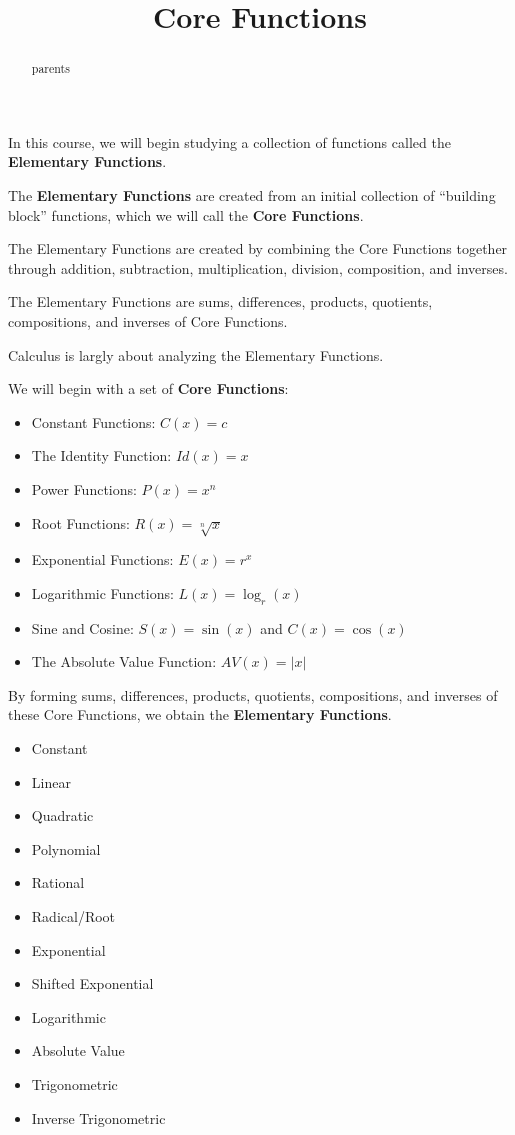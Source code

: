 \documentclass{ximera}
\title{Core Functions}
\begin{document}
\begin{abstract}
parents
\end{abstract}
\maketitle




In this course, we will begin studying a collection of functions called the \textbf{Elementary Functions}.

The \textbf{Elementary Functions} are created from an initial collection of ``building block'' functions, which we will call the \textbf{Core Functions}.

The Elementary Functions are created by combining the Core Functions together through addition, subtraction, multiplication, division, composition, and inverses.


The Elementary Functions are sums, differences, products, quotients, compositions, and inverses of Core Functions.

Calculus is largly about analyzing the Elementary Functions.






We will begin with a set of \textbf{Core Functions}:

\begin{itemize}
\item{Constant Functions: $C(x) = c$}
\item{The Identity Function: $Id(x) = x$}
\item{Power Functions: $P(x) = x^n$}
\item{Root Functions: $R(x) = \sqrt[n]{x}$}
\item{Exponential Functions: $E(x) = r^x$}
\item{Logarithmic Functions: $L(x) = \log_r(x)$}
\item{Sine and Cosine: $S(x) = \sin(x)$ and $C(x) = \cos(x)$}
\item{The Absolute Value Function: $AV(x) = |x|$}
\end{itemize}


By forming sums, differences, products, quotients, compositions, and inverses of these Core Functions, we obtain the \textbf{Elementary Functions}.


\begin{itemize}
\item{Constant}
\item{Linear}
\item{Quadratic}
\item{Polynomial}
\item{Rational}
\item{Radical/Root}
\item{Exponential}
\item{Shifted Exponential}
\item{Logarithmic}
\item{Absolute Value}
\item{Trigonometric}
\item{Inverse Trigonometric}
\end{itemize}
\end{document}
